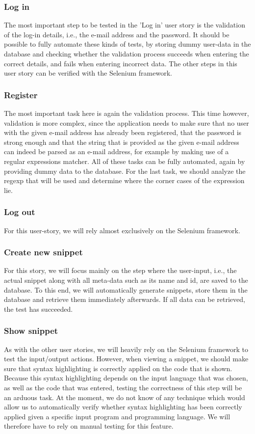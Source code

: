\documentclass {article}
\begin{document}
\subsubsection*{Log in}
The most important step to be tested in the 'Log in' user story is the
validation of the log-in details, i.e., the e-mail address and the password.  It
should be possible to fully automate these kinds of tests, by storing dummy
user-data in the database and checking whether the validation process succeeds
when entering the correct details, and fails when entering incorrect data.  The
other steps in this user story can be verified with the Selenium framework.

\subsubsection*{Register}
The most important task here is again the validation process. This time however,
validation is more complex, since the application needs to make sure that no
user with the given e-mail address has already been registered, that the
password is strong enough and that the string that is provided as the given
e-mail address can indeed be parsed as an e-mail address, for example by making
use of a regular expressions matcher.  All of these tasks can be fully
automated, again by providing dummy data to the database. For the last task, we
should analyze the regexp that will be used and determine where the corner cases
of the expression lie.

\subsubsection*{Log out}
For this user-story, we will rely almost exclusively on the Selenium framework.

\subsubsection*{Create new snippet}
For this story, we will focus mainly on the step where the user-input, i.e., the
actual snippet along with all meta-data such as its name and id, are saved to
the database.  To this end, we will automatically generate snippets, store them
in the database and retrieve them immediately afterwards. If all data can be
retrieved, the test has succeeded.

\subsubsection*{Show snippet}
As with the other user stories, we will heavily rely on the Selenium framework
to test the input/output actions. However, when viewing a snippet, we should
make sure that syntax highlighting is correctly applied on the code that is
shown.  Because this syntax highlighting depends on the input language that was
chosen, as well as the code that was entered, testing the correctness of this
step will be an arduous task.  At the moment, we do not know of any technique
which would allow us to automatically verify whether syntax highlighting has
been correctly applied given a specific input program and programming language.
We will therefore have to rely on manual testing for this feature.
\end{document}
